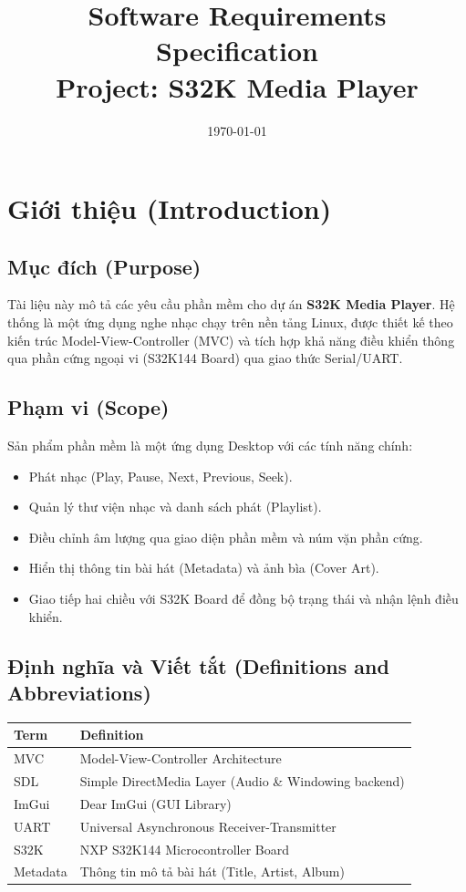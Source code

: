 \documentclass{article}
\title{\textbf{Software Requirements Specification}\\ \large Project: S32K Media Player}
\author{}
\date{\today}
\begin{document}
\maketitle
\tableofcontents
\newpage

\section{Giới thiệu (Introduction)}

\subsection{Mục đích (Purpose)}
Tài liệu này mô tả các yêu cầu phần mềm cho dự án \textbf{S32K Media Player}. Hệ thống là một ứng dụng nghe nhạc chạy trên nền tảng Linux, được thiết kế theo kiến trúc Model-View-Controller (MVC) và tích hợp khả năng điều khiển thông qua phần cứng ngoại vi (S32K144 Board) qua giao thức Serial/UART.

\subsection{Phạm vi (Scope)}
Sản phẩm phần mềm là một ứng dụng Desktop với các tính năng chính:
\begin{itemize}
    \item Phát nhạc (Play, Pause, Next, Previous, Seek).
    \item Quản lý thư viện nhạc và danh sách phát (Playlist).
    \item Điều chỉnh âm lượng qua giao diện phần mềm và núm vặn phần cứng.
    \item Hiển thị thông tin bài hát (Metadata) và ảnh bìa (Cover Art).
    \item Giao tiếp hai chiều với S32K Board để đồng bộ trạng thái và nhận lệnh điều khiển.
\end{itemize}

\subsection{Định nghĩa và Viết tắt (Definitions and Abbreviations)}
\begin{center}
\begin{tabular}{|l|p{10cm}|}
\hline
\textbf{Term} & \textbf{Definition} \\ \hline
MVC & Model-View-Controller Architecture \\ \hline
SDL & Simple DirectMedia Layer (Audio \& Windowing backend) \\ \hline
ImGui & Dear ImGui (GUI Library) \\ \hline
UART & Universal Asynchronous Receiver-Transmitter \\ \hline
S32K & NXP S32K144 Microcontroller Board \\ \hline
Metadata & Thông tin mô tả bài hát (Title, Artist, Album) \\ \hline
\end{tabular}
\end{center}
\end{document}
